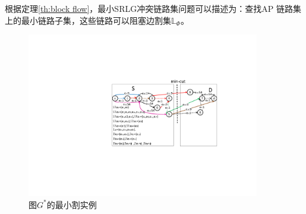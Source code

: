\begin{frame}
根据定理\ref{th:block flow}，最小SRLG冲突链路集问题可以描述为：查找AP 链路集上的最小链路子集，这些链路可以阻塞边割集$\mathbb{L}_{\Phi}$。
  \begin{figure}[htbp]
  \centering
  \includegraphics[width=4.0in]{figures/MinCutStarGraph}
  \caption{图$G^*$的最小割实例}\label{fig:MinCutStarGraph}
  \label{fig:MinCutStarGraph}
\end{figure}
\end{frame}

